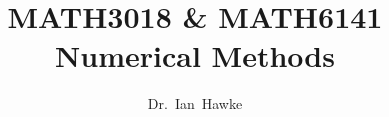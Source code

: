 \documentclass[a4paper,12pt]{report}
\begin{document}

\title{MATH3018 \& MATH6141 \\ Numerical Methods }
\author{Dr.~Ian~Hawke}
\date{}

\maketitle


\begin{titlepage}
\newpage
\mbox{}
\end{titlepage}

\tableofcontents






%








\appendix

\end{document}
